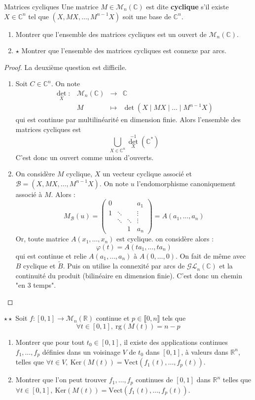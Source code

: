 \documentclass[french,a4paper]{article}
\newcommand{\R}{\mathbb{R}}
\newcommand{\C}{\mathbb{C}}
\newcommand{\st}{^*}
\newcommand{\inv}{^{-1}}
\renewcommand{\ker}{\text{Ker}}
\theoremstyle{plain}
\theoremstyle{definition}
\theoremstyle{remark}
\begin{document}
\begin{ex}[Moulin.53]{Matrices cycliques}
	Une matrice $M\in\mathcal{M}_n(\C)$ est dite \textbf{cyclique} s'il existe $X\in\C^n$ tel que $(X,MX,\ldots,M^{n-1}X)$ soit une base de $\C^n$.
	\begin{enumerate}
		\item Montrer que l'ensemble des matrices cycliques est un ouvert de $\mathcal{M}_n(\C)$.
		\item $\star$ Montrer que l'ensemble des matrices cycliques est connexe par arcs.
	\end{enumerate}
\end{ex}
\begin{proof}
	La deuxième question est difficile.
	\begin{enumerate}
		\item Soit $C\in\C^n$. On note $$\begin{array}{lrcl}
			\det_X:&\mathcal{M}_n(\C)&\longrightarrow&\C\\
			&M&\longmapsto&\det(X\mid MX\mid\ldots\mid M^{n-1}X)
		\end{array}$$ qui est continue par multilinéarité en dimension finie. Alors l'ensemble des matrices cycliques est $$\bigcup_{X\in\C^n}\det_X\inv(\C\st)$$ C'est donc un ouvert comme union d'ouverts.
		\item On considère $M$ cyclique, $X$ un vecteur cyclique associé et $\mathcal{B}=(X,MX,\ldots,M^{n-1}X)$. On note $u$ l'endomorphisme canoniquement associé à $M$. Alors : $$M_\mathcal{B}(u)=\begin{pmatrix}
			0&&&a_1\\
			1&\ddots&&\vdots\\
			&\ddots&\ddots&\vdots\\
			&&1&a_n
		\end{pmatrix}=A(a_1,\ldots,a_n)$$ Or, toute matrice $A(x_1,\ldots,x_n)$ est cyclique. on considère alors : $$\varphi(t)=A(ta_1,\ldots,ta_n)$$ qui est continue et relie $A(a_1,\ldots,a_n)$ à $A(0,\ldots,0)$. On fait de même avec $B$ cyclique et $\tilde{B}$. Puis on utilise la connexité par arcs de $\mathcal{GL}_n(\C)$ et la continuité du produit (bilinéaire en dimension finie). C'est donc un chemin "en 3 temps".
	\end{enumerate}
\end{proof}

\begin{ex}[Moulin.54]{$\star\star$}
	Soit $f:[0,1]\to\mathcal{M}_n(\R)$ continue et $p\in\llbracket0,n\rrbracket$ tels que $$\forall t\in[0,1],\ \text{rg}(M(t))=n-p$$
	\begin{enumerate}
		\item Montrer que pour tout $t_0\in[0,1]$, il existe des applications continues $f_1,\ldots,f_p$ définies dans un voisinage $V$ de $t_0$ dans $[0,1]$, à valeurs dans $\R^n$, telles que $\forall t\in V,\ \ker(M(t))=\text{Vect}(f_1(t),\ldots,f_p(t))$.
		\item Montrer que l'on peut trouver $f_1,\ldots,f_p$ continues de $[0,1]$ dans $\R^n$ telles que $\forall t\in [0,1],\ \ker(M(t))=\text{Vect}(f_1(t),\ldots,f_p(t))$.
	\end{enumerate}
\end{ex}
\end{document}
